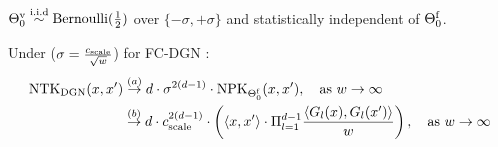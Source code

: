 \begin{assumption}\label{assmp:main}
${\Theta}^{\text{v}}_0\stackrel{\text{i.i.d}}\sim\text{Bernoulli}(\frac12)$ over $\{-{\sigma},+{\sigma}\}$ and statistically independent of $\Theta^{\textrm{f}}_0$.
\end{assumption}

\begin{theorem}
\label{th:fc} Under   ($\sigma=\frac{c_{\text{scale}}}{\sqrt{w}}$) for FC-DGN : 
\begin{align*}
\text{NTK}_{\text{DGN}}(x,x') &\stackrel{(a)}\rightarrow d \cdot \sigma^{2(d-1)} \cdot \text{NPK}_{\Theta^{\textrm{f}}_0}(x,x'), \quad\text{as}\,\, w\rightarrow \infty \\
					 &\stackrel{(b)}\rightarrow d \cdot c_{\text{scale}}^{2(d-1)} \cdot \left(\langle  x,x'\rangle \cdot \Pi_{l=1}^{d-1} \frac{\langle G_l(x),G_l(x')\rangle}w\right), \quad\text{as}\,\, w\rightarrow \infty 
\end{align*}
\end{theorem} 


